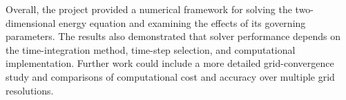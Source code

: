 Overall, the project provided a numerical framework for solving the two-dimensional energy equation and examining the effects of its governing parameters. The results also demonstrated that solver performance depends on the time-integration method, time-step selection, and computational implementation. Further work could include a more detailed grid-convergence study and comparisons of computational cost and accuracy over multiple grid resolutions. 
